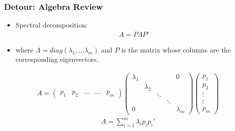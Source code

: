 \documentclass[
  shownotes,
  xcolor={svgnames},
  hyperref={colorlinks,citecolor=DarkBlue,linkcolor=DarkRed,urlcolor=DarkBlue}
  , aspectratio=169]{beamer}
\begin{document}
\begin{frame}
\frametitle{Detour: Algebra Review}
\begin{itemize}
\item Spectral decomposition: 
\medskip
\begin{align}
A = P\Lambda P' 
\end{align}
 
\item where $\Lambda = diag(\lambda_1, \dots \lambda_m )$ and $P$ is the matrix whose columns are the corresponding eigenvectors.
\end{itemize}
\begin{align}
A=\left(\begin{array}{ccccc}
p_{1} & p_{2} & \dots & \dots & p_{m}\end{array}\right)\left(\begin{array}{ccccc}
\lambda_{1} &  &  &  & 0\\
 & \lambda_{2}\\
 &  & \ddots\\
 &  &  & \ddots\\
0 &  &  &  & \lambda_{m}
\end{array}\right)\left(\begin{array}{c}
p_{1}\\
p_{2}\\
\vdots\\
\vdots\\
p_{m}
\end{array}\right)
\end{align}
\begin{align}
A=\sum_{i=1}^{m}\lambda_{i}p_{i}p_{i}'
\end{align}

\end{frame}

\end{document}
